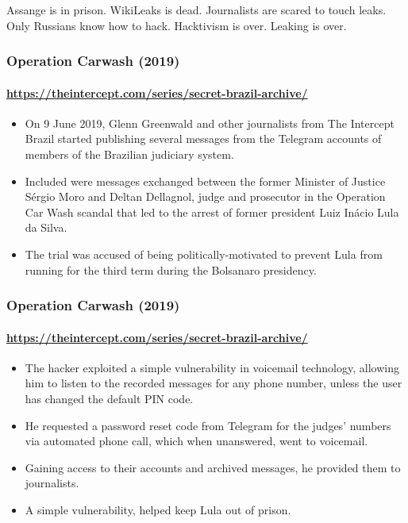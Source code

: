 \documentclass[aspectratio=169,usenames,dvipsnames]{beamer}
\begin{document}
\begin{frame}[c]

  \centering

  Assange is in prison.
  \pause\hspace{1mm}WikiLeaks is dead.
  \pause\hspace{1mm}Journalists are scared to touch leaks.
  \pause\\Only Russians know how to hack.
  \pause\hspace{1mm}Hacktivism is over.
  \pause\hspace{1mm}Leaking is over.

\end{frame}

\begin{frame}
  \frametitle{Operation Carwash (2019)}
  \framesubtitle{\url{https://theintercept.com/series/secret-brazil-archive/}}

  \begin{itemize}[<+->]
    \item On 9 June 2019, Glenn Greenwald and other journalists from The
      Intercept Brazil started publishing several messages from the
      Telegram accounts of members of the Brazilian judiciary system.
    \item Included were messages exchanged between the former Minister of
      Justice Sérgio Moro and Deltan Dellagnol, judge and prosecutor in the
      Operation Car Wash scandal that led to the arrest of former president
      Luiz Inácio Lula da Silva.
    \item The trial was accused of being politically-motivated to prevent Lula
      from running for the third term during the Bolsanaro presidency.
  \end{itemize}
\end{frame}

\begin{frame}
  \frametitle{Operation Carwash (2019)}
  \framesubtitle{\url{https://theintercept.com/series/secret-brazil-archive/}}

  \begin{itemize}[<+->]
    \item The hacker exploited a simple vulnerability in voicemail technology,
      allowing him to listen to the recorded messages for any phone number,
      unless the user has changed the default PIN code.
    \item He requested a password reset code from Telegram for the judges'
      numbers via automated phone call, which when unanswered, went to
      voicemail.
    \item Gaining access to their accounts and archived messages, he provided
      them to journalists.
    \item A simple vulnerability, helped keep Lula out of prison.
  \end{itemize}
\end{frame}
\end{document}
